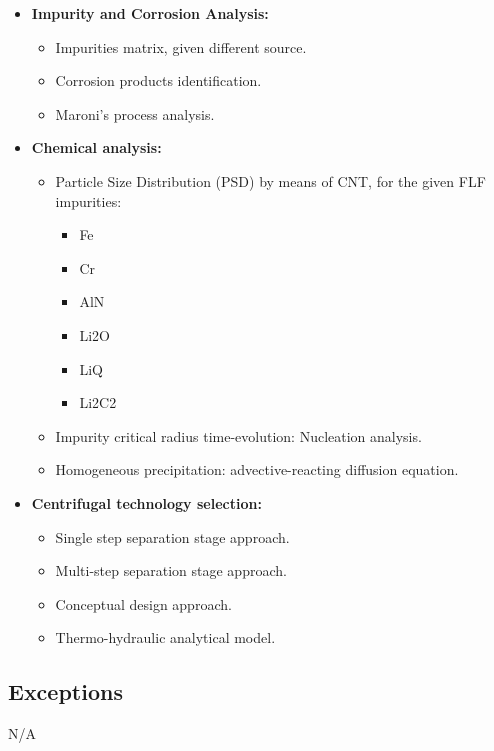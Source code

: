 \begin{itemize}
	\item \textbf{Impurity and Corrosion Analysis:}
	\begin{itemize}
		\item Impurities matrix, given different source. 
		\item Corrosion products identification. 
		\item Maroni's process analysis.
	\end{itemize}
	\item \textbf{Chemical analysis:}
	\begin{itemize}
		\item Particle Size Distribution (PSD) by means of CNT, for the given FLF impurities: 
		\begin{itemize}
			\item Fe
			\item Cr
			\item AlN
			\item Li2O
			\item LiQ
			\item Li2C2
		\end{itemize}
		\item Impurity critical radius time-evolution: Nucleation analysis.
		\item Homogeneous precipitation: advective-reacting diffusion equation.
	\end{itemize}
	\item \textbf{Centrifugal technology selection:}
	\begin{itemize}
		\item Single step separation stage approach.
		\item Multi-step separation stage approach.
		\item Conceptual design approach.
		\item Thermo-hydraulic analytical model.
	\end{itemize}
\end{itemize}
\subsection{Exceptions} 
N/A
